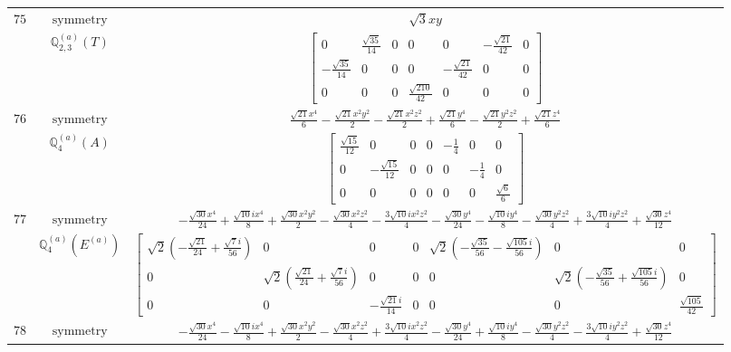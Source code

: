 \documentclass[fleqn,8pt,landscape]{jsarticle}
\begin{document}
\begin{longtable}{ccc}
$ 75 $ & $ \text{symmetry} $ & $ \sqrt{3} x y $ \\
$  $ & $ \mathbb{Q}_{2,3}^{(a)}(T) $ & $ \begin{bmatrix} 0 & \frac{\sqrt{35}}{14} & 0 & 0 & 0 & - \frac{\sqrt{21}}{42} & 0 \\ - \frac{\sqrt{35}}{14} & 0 & 0 & 0 & - \frac{\sqrt{21}}{42} & 0 & 0 \\ 0 & 0 & 0 & \frac{\sqrt{210}}{42} & 0 & 0 & 0 \end{bmatrix} $ \\ \hline
$ 76 $ & $ \text{symmetry} $ & $ \frac{\sqrt{21} x^{4}}{6} - \frac{\sqrt{21} x^{2} y^{2}}{2} - \frac{\sqrt{21} x^{2} z^{2}}{2} + \frac{\sqrt{21} y^{4}}{6} - \frac{\sqrt{21} y^{2} z^{2}}{2} + \frac{\sqrt{21} z^{4}}{6} $ \\
$  $ & $ \mathbb{Q}_{4}^{(a)}(A) $ & $ \begin{bmatrix} \frac{\sqrt{15}}{12} & 0 & 0 & 0 & - \frac{1}{4} & 0 & 0 \\ 0 & - \frac{\sqrt{15}}{12} & 0 & 0 & 0 & - \frac{1}{4} & 0 \\ 0 & 0 & 0 & 0 & 0 & 0 & \frac{\sqrt{6}}{6} \end{bmatrix} $ \\ \hline
$ 77 $ & $ \text{symmetry} $ & $ - \frac{\sqrt{30} x^{4}}{24} + \frac{\sqrt{10} i x^{4}}{8} + \frac{\sqrt{30} x^{2} y^{2}}{2} - \frac{\sqrt{30} x^{2} z^{2}}{4} - \frac{3 \sqrt{10} i x^{2} z^{2}}{4} - \frac{\sqrt{30} y^{4}}{24} - \frac{\sqrt{10} i y^{4}}{8} - \frac{\sqrt{30} y^{2} z^{2}}{4} + \frac{3 \sqrt{10} i y^{2} z^{2}}{4} + \frac{\sqrt{30} z^{4}}{12} $ \\
$  $ & $ \mathbb{Q}_{4}^{(a)}(E^{(a)}) $ & $ \begin{bmatrix} \sqrt{2} \left(- \frac{\sqrt{21}}{24} + \frac{\sqrt{7} i}{56}\right) & 0 & 0 & 0 & \sqrt{2} \left(- \frac{\sqrt{35}}{56} - \frac{\sqrt{105} i}{56}\right) & 0 & 0 \\ 0 & \sqrt{2} \left(\frac{\sqrt{21}}{24} + \frac{\sqrt{7} i}{56}\right) & 0 & 0 & 0 & \sqrt{2} \left(- \frac{\sqrt{35}}{56} + \frac{\sqrt{105} i}{56}\right) & 0 \\ 0 & 0 & - \frac{\sqrt{21} i}{14} & 0 & 0 & 0 & \frac{\sqrt{105}}{42} \end{bmatrix} $ \\ \hline
$ 78 $ & $ \text{symmetry} $ & $ - \frac{\sqrt{30} x^{4}}{24} - \frac{\sqrt{10} i x^{4}}{8} + \frac{\sqrt{30} x^{2} y^{2}}{2} - \frac{\sqrt{30} x^{2} z^{2}}{4} + \frac{3 \sqrt{10} i x^{2} z^{2}}{4} - \frac{\sqrt{30} y^{4}}{24} + \frac{\sqrt{10} i y^{4}}{8} - \frac{\sqrt{30} y^{2} z^{2}}{4} - \frac{3 \sqrt{10} i y^{2} z^{2}}{4} + \frac{\sqrt{30} z^{4}}{12} $ \\

\end{longtable}
\end{document}
